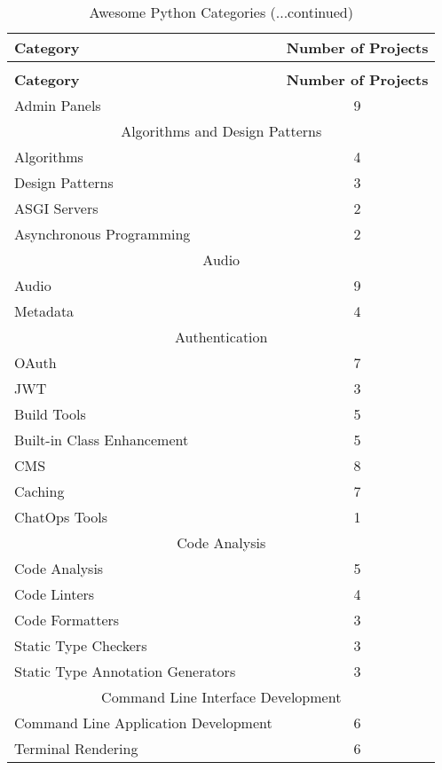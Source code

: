 
\centering
\begin{longtable} {|l|c|}
    \caption[Awesome Python Categories]{Awesome Python Categories \label{table:awesome-python-categories}}\\
    \hline
    \textbf{Category} & \textbf{Number of Projects}\\
    \hline
    \endfirsthead
    \caption[]{Awesome Python Categories (...continued)}\\
    \hline
    \textbf{Category} & \textbf{Number of Projects}\\
    \hline
    \endhead
    \hline
    \endfoot
    Admin Panels & 9\\
    \hline
    \multicolumn{2}{|c|}{Algorithms and Design Patterns}\\
    \hline
    Algorithms & 4\\
    Design Patterns & 3\\
    \hline
    ASGI Servers & 2\\
    \hline
    Asynchronous Programming & 2\\
    \hline
    \multicolumn{2}{|c|}{Audio}\\
    \hline
    Audio & 9\\
    Metadata & 4\\
    \hline
    \multicolumn{2}{|c|}{Authentication}\\
    \hline
    OAuth & 7\\
    JWT & 3\\
    \hline
    Build Tools & 5\\
    \hline
    Built-in Class Enhancement & 5\\
    \hline
    CMS & 8\\
    \hline
    Caching & 7\\
    \hline
    ChatOps Tools & 1\\
    \hline
    \multicolumn{2}{|c|}{Code Analysis}\\
    \hline
    Code Analysis & 5\\
    Code Linters & 4\\
    Code Formatters & 3\\
    Static Type Checkers & 3\\
    Static Type Annotation Generators & 3\\
    \hline
    \multicolumn{2}{|c|}{Command Line Interface Development}\\
    \hline
    Command Line Application Development & 6\\
    Terminal Rendering & 6\\

\end{longtable}
